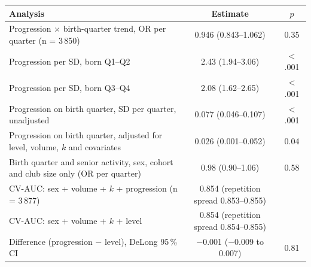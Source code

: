 \begin{tabular}{lcc}
\toprule
Analysis & Estimate & $p$ \\
\midrule
Progression $\times$ birth-quarter trend, OR per quarter (n = 3\,850) & 0.946 (0.843--1.062) & 0.35 \\
Progression per SD, born Q1--Q2 & 2.43 (1.94--3.06) & $<$.001 \\
Progression per SD, born Q3--Q4 & 2.08 (1.62--2.65) & $<$.001 \\
Progression on birth quarter, SD per quarter, unadjusted & 0.077 (0.046--0.107) & $<$.001 \\
Progression on birth quarter, adjusted for level, volume, $k$ and covariates & 0.026 (0.001--0.052) & 0.04 \\
Birth quarter and senior activity, sex, cohort and club size only (OR per quarter) & 0.98 (0.90--1.06) & 0.58 \\
\midrule
CV-AUC: sex + volume + $k$ + progression (n = 3\,877) & 0.854 (repetition spread 0.853--0.855) &  \\
CV-AUC: sex + volume + $k$ + level & 0.854 (repetition spread 0.854--0.855) &  \\
Difference (progression $-$ level), DeLong 95\,\% CI & $-$0.001 ($-$0.009 to 0.007) & 0.81 \\
\bottomrule
\end{tabular}
